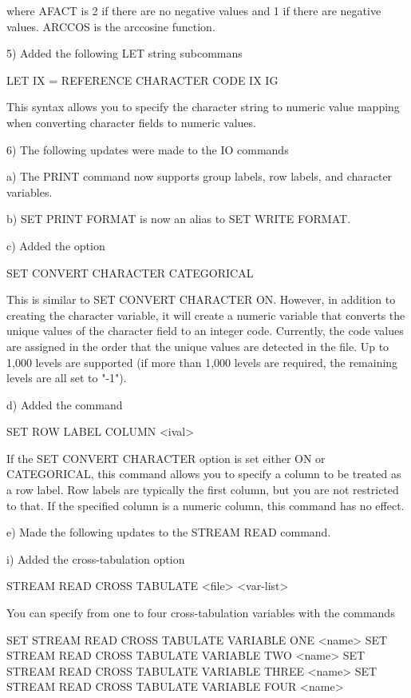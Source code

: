     where AFACT is 2 if there are no negative values and 1 if there
    are negative values.  ARCCOS is the arccosine function.

 5) Added the following LET string subcommans

       LET IX = REFERENCE CHARACTER CODE IX IG

    This syntax allows you to specify the character string to numeric
    value mapping when converting character fields to numeric values.

 6) The following updates were made to the IO commands

    a) The PRINT command now supports group labels, row labels, and
       character variables.

    b) SET PRINT FORMAT is now an alias to SET WRITE FORMAT.

    c) Added the option

         SET CONVERT CHARACTER CATEGORICAL

       This is similar to SET CONVERT CHARACTER ON.  However, in
       addition to creating the character variable, it will create
       a numeric variable that converts the unique values of the
       character field to an integer code.  Currently, the code values
       are assigned in the order that the unique values are detected
       in the file.  Up to 1,000 levels are supported (if more than
       1,000 levels are required, the remaining levels are all set
       to "-1").

    d) Added the command

         SET ROW LABEL COLUMN <ival>

       If the SET CONVERT CHARACTER option is set either ON or
       CATEGORICAL, this command allows you to specify a column to be
       treated as a row label.  Row labels are typically the first
       column, but you are not restricted to that.  If the specified
       column is a numeric column, this command has no effect.

    e) Made the following updates to the STREAM READ command.

         i) Added the cross-tabulation option

               STREAM READ CROSS TABULATE <file>  <var-list>

            You can specify from one to four cross-tabulation variables
            with the commands

               SET STREAM READ CROSS TABULATE VARIABLE ONE <name>
               SET STREAM READ CROSS TABULATE VARIABLE TWO <name>
               SET STREAM READ CROSS TABULATE VARIABLE THREE <name>
               SET STREAM READ CROSS TABULATE VARIABLE FOUR <name>

